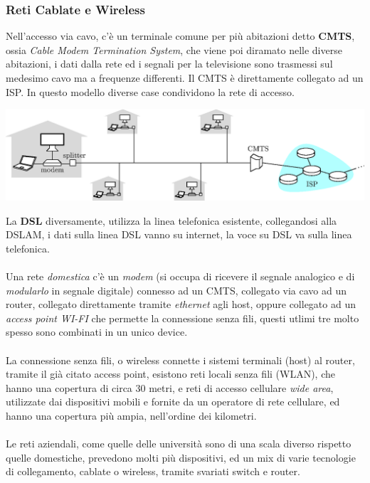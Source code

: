 \documentclass[12pt, letterpaper]{article}
\newcommand{\acc}{\\\hphantom{}\\}
\begin{document}
\subsubsection{Reti Cablate e Wireless}
Nell'accesso via cavo, c'è un terminale comune per più abitazioni detto \textbf{CMTS}, ossia \textit{Cable Modem Termination System},
che viene poi diramato nelle diverse abitazioni, i dati dalla rete ed i segnali per la televisione sono trasmessi sul medesimo
cavo ma a frequenze differenti. Il CMTS è direttamente collegato ad un ISP. In questo modello diverse case condividono la rete di
accesso.\begin{center}
    \includegraphics[width=1.1\textwidth ]{images/cableHeadend.eps}
\end{center}
La \textbf{DSL} diversamente, utilizza la linea telefonica esistente, collegandosi alla DSLAM, i dati sulla linea
DSL vanno su internet, la voce su DSL va sulla linea telefonica. \acc
Una rete \textit{domestica}  c'è un \textit{modem}
(si occupa di ricevere il segnale analogico e di  \textit{modularlo} in segnale digitale)
connesso ad un CMTS, collegato via cavo ad
un router, collegato direttamente tramite \textit{ethernet} agli host, oppure collegato ad un \textit{access point WI-FI} che
permette la connessione senza fili, questi utlimi tre molto spesso sono combinati in un unico device.\acc
La connessione senza fili, o wireless connette i sistemi terminali (host) al router, tramite il già citato
access point, esistono reti locali senza fili (WLAN), che hanno una copertura di circa 30 metri, e reti di accesso
cellulare \textit{wide area}, utilizzate dai dispositivi mobili e fornite da un operatore di rete cellulare, ed hanno una
copertura più ampia, nell'ordine dei kilometri.\acc
Le reti aziendali, come quelle delle università sono di una scala diverso rispetto quelle domestiche, prevedono molti più
dispositivi, ed un mix di varie tecnologie di collegamento, cablate o wireless, tramite svariati switch e router.
\end{document}
